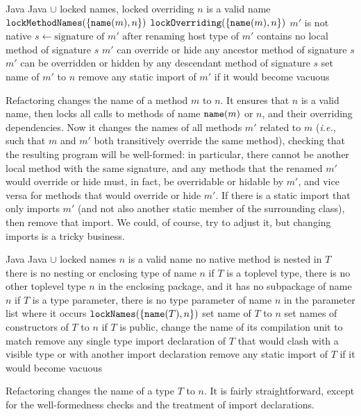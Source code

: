 \begin{algorithm}
\caption{$\refactoring{Rename Method}(m : \type{Method}, n : \type{Name}$}
\begin{algorithmic}[1]
\REQUIRE Java
\ENSURE Java $\cup$ locked names, locked overriding
\medskip
\STATE \assert $n$ is a valid name
\STATE $\text{\texttt{lockMethodNames}}(\{\text{\texttt{name}}(m), n\})$
\STATE $\text{\texttt{lockOverriding}}(\{\text{\texttt{name}}(m), n\})$
  \STATE \assert $m'$ is not native
  \STATE $s\leftarrow\text{signature of $m'$ after renaming}$
  \STATE \assert host type of $m'$ contains no local method of signature $s$
  \STATE \assert $m'$ can override or hide any ancestor method of signature $s$
  \STATE \assert $m'$ can be overridden or hidden by any descendant method of signature $s$
  \STATE set name of $m'$ to $n$
  \STATE remove any static import of $m'$ if it would become vacuous
\ENDFOR
\end{algorithmic}
\end{algorithm}

Refactoring  changes the name of a method $m$ to $n$. It ensures that $n$ is a valid name, then locks all calls to methods of name $\text{\texttt{name}}(m)$ or $n$, and their overriding dependencies. Now it changes the names of all methods $m'$ related to $m$ (\emph{i.e.}, such that $m$ and $m'$ both transitively override the same method), checking that the resulting program will be well-formed: in particular, there cannot be another local method with the same signature, and any methods that the renamed $m'$ would override or hide must, in fact, be overridable or hidable by $m'$, and vice versa for methods that would override or hide $m'$. If there is a static import that only imports $m'$ (and not also another static member of the surrounding class), then remove that import. We could, of course, try to adjust it, but changing imports is a tricky business.

\begin{algorithm}
\caption{$\refactoring{Rename Type}(T : \type{Type}, n : \type{Name}$}
\begin{algorithmic}[1]
\REQUIRE Java
\ENSURE Java $\cup$ locked names
\medskip
\STATE \assert $n$ is a valid name
\STATE \assert no native method is nested in $T$
\STATE \assert there is no nesting or enclosing type of name $n$
\STATE \assert if $T$ is a toplevel type, there is no other toplevel type $n$ in the enclosing package, and it has no subpackage of name $n$
\STATE \assert if $T$ is a type parameter, there is no type parameter of name $n$ in the parameter list where it occurs
\STATE $\text{\texttt{lockNames}}(\{\text{\texttt{name}}(T), n\})$
\STATE set name of $T$ to $n$
\STATE set names of constructors of $T$ to $n$
\STATE if $T$ is public, change the name of its compilation unit to match
\STATE remove any single type import declaration of $T$ that would clash with a visible type or with another import declaration
\STATE remove any static import of $T$ if it would become vacuous
\end{algorithmic}
\end{algorithm}

Refactoring  changes the name of a type $T$ to $n$.  It is fairly straightforward, except for the well-formedness checks and the treatment of import declarations.
